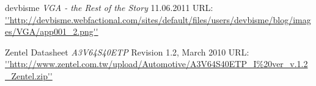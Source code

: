\renewcommand\bibname{Quellenverzeichnis}
\begin{thebibliography}{99}

devbisme
\emph{VGA - the Rest of the Story}
11.06.2011
URL: \url{''http://devbisme.webfactional.com/sites/default/files/users/devbisme/blog/images/VGA/app001_2.png''}

Zentel Datasheet
\emph{A3V64S40ETP}
Revision 1.2, March 2010
URL: 
\url{''http://www.zentel.com.tw/upload/Automotive/A3V64S40ETP_I\%20ver_v.1.2_Zentel.zip''}

\end{thebibliography}